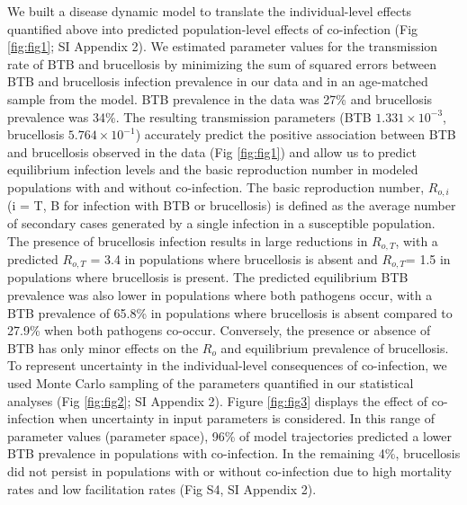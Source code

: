 \documentclass[10pt,letterpaper]{article}
\begin{document}
We built a disease dynamic model to translate the individual-level effects quantified above into predicted population-level effects of co-infection (Fig \ref{fig:fig1}; SI Appendix 2). We estimated parameter values for the transmission rate of BTB and brucellosis by minimizing the sum of squared errors between BTB and brucellosis infection prevalence in our data and in an age-matched sample from the model. BTB prevalence in the data was 27\% and brucellosis prevalence was 34\%. The resulting transmission parameters (BTB $1.331 \times 10^{-3}$, brucellosis $5.764 \times 10^{-1}$) accurately predict the positive association between BTB and brucellosis observed in the data (Fig \ref{fig:fig1}) and allow us to predict equilibrium infection levels and the basic reproduction number in modeled populations with and without co-infection. The basic reproduction number, $R_{o,i}$ (i = T, B for infection with BTB or brucellosis) is defined as the average number of secondary cases generated by a single infection in a susceptible population. The presence of brucellosis infection results in large reductions in $R_{o,T}$, with a predicted $R_{o,T}$ = 3.4 in populations where brucellosis is absent and $R_{o,T}$= 1.5 in populations where brucellosis is present. The predicted equilibrium BTB prevalence was also lower in populations where both pathogens occur, with a BTB prevalence of 65.8\% in populations where brucellosis is absent compared to 27.9\% when both pathogens co-occur. Conversely, the presence or absence of BTB has only minor effects on the $R_o$ and equilibrium prevalence of brucellosis. To represent uncertainty in the individual-level consequences of co-infection, we used Monte Carlo sampling of the parameters quantified in our statistical analyses (Fig \ref{fig:fig2}; SI Appendix 2).  Figure \ref{fig:fig3} displays the effect of co-infection when uncertainty in input parameters is considered. In this range of parameter values (parameter space), 96\% of model trajectories predicted a lower BTB prevalence in populations with co-infection. In the remaining 4\%, brucellosis did not persist in populations with or without co-infection due to high mortality rates and low facilitation rates (Fig S4, SI Appendix 2).
\end{document}
